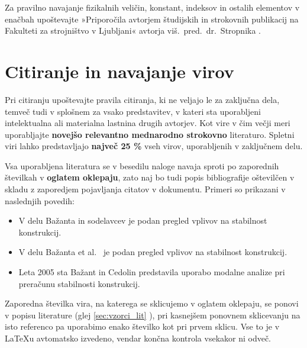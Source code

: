 Za pravilno navajanje fizikalnih veličin, konstant, indeksov in ostalih elementov v enačbah upoštevajte »Priporočila avtorjem študijskih in strokovnih publikacij na Fakulteti za strojništvo v Ljubljani« avtorja viš.\ pred.\ dr.\ Stropnika \cite{stropnik_1997}.

\section{Citiranje in navajanje virov}\label{sec:citiranje}

Pri citiranju upoštevajte pravila citiranja, ki ne veljajo le za zaključna dela, temveč tudi v splošnem za vsako predstavitev, v kateri sta uporabljeni intelektualna ali materialna lastnina drugih avtorjev. Kot vire v čim večji meri uporabljajte \textbf{novejšo relevantno mednarodno strokovno} literaturo. Spletni viri lahko predstavljajo \textbf{največ 25 \%} vseh virov, uporabljenih v zaključnem delu.

Vsa uporabljena literatura se v besedilu naloge navaja sproti po zaporednih številkah v \textbf{oglatem oklepaju}, zato naj bo tudi popis bibliografije oštevilčen v skladu z zaporedjem pojavljanja citatov v dokumentu. Primeri so prikazani v naslednjih povedih:
\begin{itemize}
	\item V delu Bažanta in sodelavcev \cite{bazant_1991} je podan pregled vplivov na stabilnost konstrukcij.
	\item V delu Bažanta et al.\ \cite{bazant_1991} je podan pregled vplivov na stabilnost konstrukcij.
	\item Leta 2005 sta Bažant in Cedolin \cite{bazant_1991} predstavila uporabo modalne analize pri preračunu stabilnosti konstrukcij.
\end{itemize}

Zaporedna številka vira, na katerega se sklicujemo v oglatem oklepaju, se ponovi v popisu literature (glej \ref{sec:vzorci_lit} ), pri kasnejšem ponovnem sklicevanju na isto referenco pa uporabimo enako številko kot pri prvem sklicu. Vse to je v \LaTeX u avtomatsko izvedeno, vendar končna kontrola vsekakor ni odveč.

